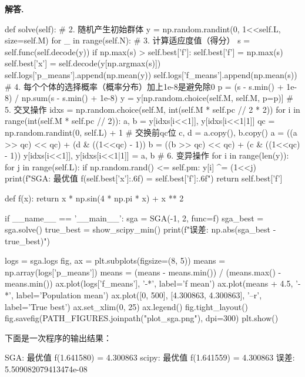 \documentclass[12pt, a4paper, oneside]{ctexart}
\newenvironment{solution}[1][]{\par\noindent\textbf{#1解答. }}{\smallskip\par}  %
\begin{document}
\begin{solution}
\begin{pythoncode}
    def solve(self):
        # 2. 随机产生初始群体
        y = np.random.randint(0, 1<<self.L, size=self.M)
        for _ in range(self.N):
            # 3. 计算适应度值（得分）
            s = self.func(self.decode(y))
            if np.max(s) > self.best['f']:
                self.best['f'] = np.max(s)
                self.best['x'] = self.decode(y[np.argmax(s)])
            self.logs['p_means'].append(np.mean(y))
            self.logs['f_means'].append(np.mean(s))
            # 4. 每个个体的选择概率（概率分布）加上1e-8是避免除0
            p = (s - s.min() + 1e-8) / np.sum(s - s.min() + 1e-8)
            y = y[np.random.choice(self.M, self.M, p=p)]
            # 5. 交叉操作
            idxs = np.random.choice(self.M, int(self.M * self.pc // 2 * 2))
            for i in range(int(self.M * self.pc // 2)):
                a, b = y[idxs[i<<1]], y[idxs[i<<1|1]]
                qc = np.random.randint(0, self.L) + 1  # 交换前qc位
                c, d = a.copy(), b.copy()
                a = ((a >> qc) << qc) + (d & ((1<<qc) - 1))
                b = ((b >> qc) << qc) + (c & ((1<<qc) - 1))
                y[idxs[i<<1]], y[idxs[i<<1|1]] = a, b
            # 6. 变异操作
            for i in range(len(y)):
                for j in range(self.L):
                    if np.random.rand() <= self.pm:
                        y[i] ^= (1<<j)
        print(f"SGA: 最优值 f({self.best['x']:.6f}) = {self.best['f']:.6f}")
        return self.best['f']

def f(x): return x * np.sin(4 * np.pi * x) + x ** 2

if __name__ == '__main__':
    sga = SGA(-1, 2, func=f)
    sga_best = sga.solve()
    true_best = show_scipy_min()
    print(f"误差: {np.abs(sga_best - true_best)}")
    
    logs = sga.logs
    fig, ax = plt.subplots(figsize=(8, 5))
    means = np.array(logs['p_means'])
    means = (means - means.min()) / (means.max() - means.min())
    ax.plot(logs['f_means'], '-*', label='f mean')
    ax.plot(means + 4.5, '-*', label='Population mean')
    ax.plot([0, 500], [4.300863, 4.300863], '--r', label='True best')
    ax.set_xlim(0, 25)
    ax.legend()
    fig.tight_layout()
    fig.savefig(PATH_FIGURES.joinpath("plot_sga.png"), dpi=300)
    plt.show()
\end{pythoncode}
\end{solution}

下面是一次程序的输出结果：

\begin{pythoncode}
SGA: 最优值 f(1.641580) = 4.300863
scipy: 最优值 f(1.641559) = 4.300863
误差: 5.509082079413474e-08
\end{pythoncode}
\end{document}

